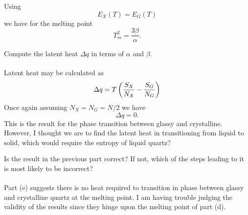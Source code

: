 \documentclass[11pt,letterpaper]{article}
\begin{document}
		Using
		\[
			E_X(T) = E_G(T)
		\]
		we have for the melting point
		\[
			T^2_m = \frac{3\beta}{\alpha}.
		\]
		\item
		Compute the latent heat $\Delta q$ in terms of $\alpha$ and $\beta$.
		\\
		\\
		Latent heat may be calculated as
		\[
			\Delta q = T\left(\frac{S_X}{N_X}-\frac{S_G}{N_G}\right)
		\]
		Once again assuming $N_X = N_G=N/2$ we have
		\[
			\Delta q = 0.
		\]
		This is the result for the phase transition between glassy and crystalline. However, I thought we are to find the 
		latent heat in transitioning from liquid to solid, which would require the entropy of liquid quartz?
		\\
		\item 
		Is the result in the previous part correct? If not, which of the steps leading to it is most likely to be incorrect?
		\\
		\\
		Part (e) suggests there is no heat required to transition in phase between glassy
		and crystalline quartz at the melting point. I am having trouble judging the validity of the results
		since they hinge upon the melting point of part (d). 
		
	\eenum
	 
\eenum
\end{document}
